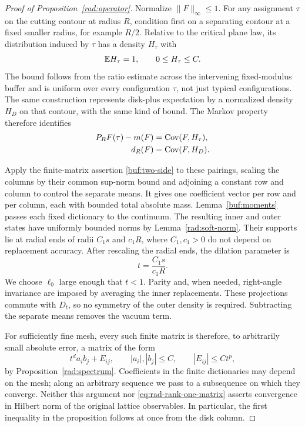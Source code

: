 \begin{proof}[Proof of Proposition~\ref{rad:operator}]
Normalize $\|F\|_\infty\leq1$.  For any assignment $\tau$ on the
cutting contour at radius $R$, condition first on a separating
contour at a fixed smaller radius, for example $R/2$.  Relative
to the critical plane law, its distribution induced by $\tau$
has a density $H_\tau$ with
\[
                  \mathbb E H_\tau=1,\qquad 0\leq H_\tau\leq C.
\]
The bound follows from the ratio estimate across the intervening
fixed-modulus buffer and is uniform over every configuration
$\tau$, not just typical configurations.  The same construction
represents disk-plus expectation by a normalized density $H_D$
on that contour, with the same kind of bound.  The Markov property
therefore identifies
\begin{equation}
 \begin{split}
 P_RF(\tau)-m(F)&=\operatorname{Cov}(F,H_\tau),\\
 d_R(F)&=\operatorname{Cov}(F,H_D).
 \end{split}
 \label{eq:rad-test-columns}
\end{equation}

Apply the finite-matrix assertion \eqref{buf:two-side} to these
pairings, scaling the columns by their common sup-norm bound and
adjoining a constant row and column to control the separate means.
It gives one coefficient vector per row and per column, each with
bounded total absolute mass.  Lemma~\ref{buf:moments} passes each
fixed dictionary to the continuum.  The resulting inner and outer
states have uniformly bounded norms by Lemma~\ref{rad:soft-norm}.
Their supports lie at radial
ends of radii $C_1s$ and $c_1R$, where $C_1,c_1>0$ do not depend
on replacement accuracy.  After rescaling the radial ends, the
dilation parameter is
\[
                         t=\frac{C_1s}{c_1R}.
\]
We choose $\ell_0$ large enough that $t<1$.  Parity and, when
needed, right-angle invariance are imposed by averaging the
inner replacements.  These projections commute with $D_t$, so
no symmetry of the outer density is required.  Subtracting the
separate means removes the vacuum term.

For sufficiently fine mesh, every such finite matrix is therefore,
to arbitrarily small absolute error, a matrix of the form
\begin{equation}
                 t^d a_i b_j+E_{ij},
                 \qquad |a_i|,|b_j|\leq C,
                 \qquad |E_{ij}|\leq Ct^p,
 \label{eq:rad-rank-one-matrix}
\end{equation}
by Proposition~\ref{rad:spectrum}.  Coefficients in the finite
dictionaries may depend on the mesh; along an arbitrary sequence
we pass to a subsequence on which they converge.  Neither this
argument nor \eqref{eq:rad-rank-one-matrix} asserts convergence in
Hilbert norm of the original lattice observables.  In particular,
the first inequality in the proposition follows at once from
the disk column.


\end{proof}
